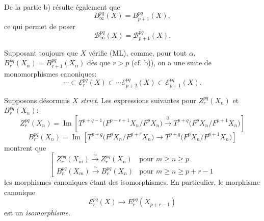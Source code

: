 \documentclass[11pt]{article}
\providecommand{\Im}{\operatorname{Im}}
\renewcommand{\Im}{\operatorname{Im}}
\providecommand{\Im}{\operatorname{Im}}
\begin{document}
De la partie b) résulte également que
\[
B_\infty^{pq}(X)=B_{p+1}^{pq}(X),
\]
ce qui permet de poser
\[
\mathcal B_\infty^{pq}(X)=\mathcal B_{p+1}^{pq}(X).
\]

Supposant toujours que \(X\) vérifie (ML), comme, pour tout \(\alpha\),
\(B_r^{pq}(X_\alpha)=B_{r+1}^{pq}(X_\alpha)\) dès que \(r>p\) (cf. b)),
on a une suite de monomorphismes canoniques:
\begin{equation}
\cdots\subset\mathcal E_r^{pq}(X)\subset\cdots\mathcal E_{p+2}^{pq}(X)\subset\mathcal E_{p+1}^{pq}(X).
\tag{S}
\end{equation}

Supposons désormais \(X\) \emph{strict}. Les expressions suivantes pour \(Z_r^{pq}(X_n)\) et \(B_r^{pq}(X_n)\):
\[
Z_r^{pq}(X_n)=
\Im\!\left[
T^{p+q-1}\bigl(F^{p-r+1}X_n/F^pX_n\bigr)
\xrightarrow{\partial}
T^{p+q}\bigl(F^pX_n/F^{p+1}X_n\bigr)
\right]
\]
\[
B_r^{pq}(X_n)=
\Im\!\left[
T^{p+q}\bigl(F^pX_n/F^{p+r}X_n\bigr)
\longrightarrow
T^{p+q}\bigl(F^pX_n/F^{p+1}X_n\bigr)
\right]
\]
montrent que
\begin{equation}
\left[
\begin{array}{ll}
Z_r^{pq}(X_m)\xrightarrow{\sim}Z_r^{pq}(X_n)&\text{pour }m\ge n\ge p\\[3pt]
B_r^{pq}(X_m)\xrightarrow{\sim}B_r^{pq}(X_n)&\text{pour }m\ge n\ge p+r-1
\end{array}
\right.
\tag{\(d_1\)}
\end{equation}
les morphismes canoniques étant des isomorphismes. En particulier, le morphisme canonique
\[
\mathcal E_r^{pq}(X)\longrightarrow E_r^{pq}(X_{p+r-1})
\]
est un \emph{isomorphisme}.
\end{document}
